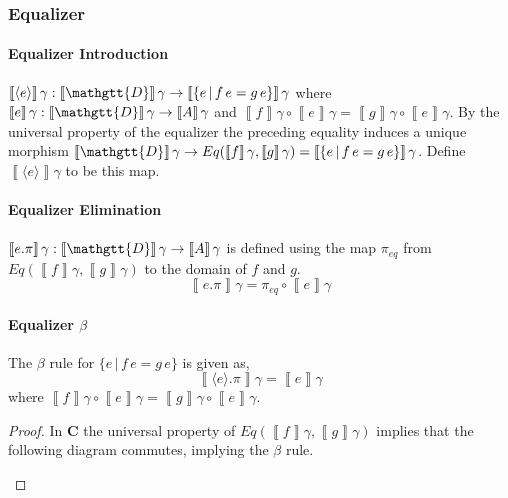 \documentclass[acmsmall,nonacm]{acmart}
\renewcommand{\Delta}{\mathgtt{D}}
\newcommand{\sem}[1]{\left\llbracket{#1}\right\rrbracket}
\newcommand{\semg}[1]{\sem{#1}\gamma}
\newcommand{\semcat}{\mathbf{C}}
\newcommand{\applto}[2]{#1 \, #2}
\newcommand{\equalizer}[3]{\{#1\,|\,\applto {#2}{#1} = \applto{#3}{#1} \}}
\newcommand{\equalizerin}[1]{\langle #1 \rangle}
\newcommand{\equalizerpi}[1]{#1.\pi}
\begin{document}
{\subsubsection{Equalizer}
\paragraph{Equalizer Introduction}
$\semg{\equalizerin{e}} : \semg{\Delta} \to \semg{\equalizer e f g}$ where
$\semg{e} : \semg{\Delta} \to \semg{A}$ and
$\semg{f} \circ \semg{e} = \semg{g} \circ \semg{e}$. By the universal property
of the equalizer the preceding equality induces a unique morphism
$\semg{\Delta} \to Eq(\semg{f} , \semg{g}) = \semg{\equalizer e f g}$. Define
$\semg{\equalizerin{e}}$ to be this map.

\paragraph{Equalizer Elimination}
$\semg{\equalizerpi e} : \semg{\Delta} \to \semg{A}$ is defined using the map
$\pi_{eq}$ from $Eq(\semg{f} , \semg{g})$ to the domain of $f$ and $g$.
\[
  \semg{\equalizerpi e} = \pi_{eq} \circ \semg{e}
\]
\paragraph{Equalizer $\beta$}
The $\beta$ rule for $\equalizer e f g$ is given as,
\[
\semg{\equalizerpi {\equalizerin e}} = \semg{e}
\]
where $\semg{f} \circ \semg{e} = \semg{g} \circ \semg{e}$.
\begin{proof}
  In $\semcat$ the universal property of $Eq(\semg{f}, \semg{g})$ implies that
  the following diagram commutes, implying the $\beta$ rule.

\begin{center}
\end{center}
\end{proof}

}
\end{document}

